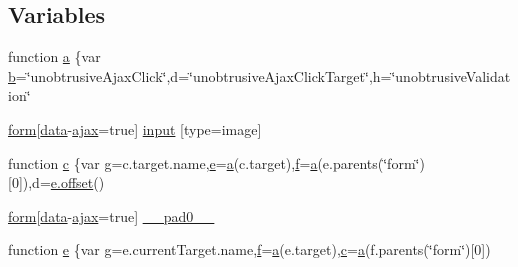 \subsection*{Variables}
\begin{DoxyCompactItemize}
\item 
function \hyperlink{jquery_8unobtrusive-ajax_8min_8js_aa4d4888597588a84fd5b1184d00c91f3}{a} \{var \hyperlink{_scripts_2bootstrap_8min_8js_a7c192e47b11481e4717b9f1e04eb4420}{b}=\char`\"{}unobtrusive\+Ajax\+Click\char`\"{},d=\char`\"{}unobtrusive\+Ajax\+Click\+Target\char`\"{},h=\char`\"{}unobtrusive\+Validation\char`\"{}
\item 
\hyperlink{login_8js_acfb5ebf8920e47b6c6d297e6ca2a6ce0}{form}\mbox{[}\hyperlink{jquery_8unobtrusive-ajax_8min_8js_a8f172ae31c11770303ca0c4cb48ceb3a}{data}-\/\hyperlink{_scripts_2jquery_8validate_8js_a77004c0fdc08a5bc07afa0b099cdf6df}{ajax}=true\mbox{]} \hyperlink{jquery_8unobtrusive-ajax_8min_8js_a22211e450825dd03852dfba097324407}{input} \mbox{[}type=image\mbox{]}
\item 
function \hyperlink{jquery_8unobtrusive-ajax_8min_8js_ad9d1ac02e33c4aed62ad517a7cb8b3fb}{c} \{var \hyperlink{jquery_8unobtrusive-ajax_8min_8js_abdf64181dd0fecc8ac45c3cfa81562b1}{g}=c.\+target.\+name,\hyperlink{jquery_8unobtrusive-ajax_8min_8js_a1bbdb559c9d41205c42f84b233650eb3}{e}=\hyperlink{jquery_8unobtrusive-ajax_8min_8js_a9cf3d65797f4cbe9deaab01492290370}{a}(c.\+target),\hyperlink{_scripts_2jquery_8validate_8unobtrusive_8min_8js_a775508d78fd0500ad5567eb03db78606}{f}=\hyperlink{jquery_8unobtrusive-ajax_8min_8js_a9cf3d65797f4cbe9deaab01492290370}{a}(e.\+parents(\char`\"{}form\char`\"{})\mbox{[}0\mbox{]}),d=\hyperlink{_scripts_2jquery-1_810_82_8js_a4a9f594d20d927164551fc7fa4751a2f}{e.\+offset}()
\item 
\hyperlink{login_8js_acfb5ebf8920e47b6c6d297e6ca2a6ce0}{form}\mbox{[}\hyperlink{jquery_8unobtrusive-ajax_8min_8js_a8f172ae31c11770303ca0c4cb48ceb3a}{data}-\/\hyperlink{_scripts_2jquery_8validate_8js_a77004c0fdc08a5bc07afa0b099cdf6df}{ajax}=true\mbox{]} \hyperlink{jquery_8unobtrusive-ajax_8min_8js_aacc01fb2f7f20fad36cb15fd09efb750}{\+\_\+\+\_\+pad0\+\_\+\+\_\+}
\item 
function \hyperlink{jquery_8unobtrusive-ajax_8min_8js_a2c038346d47955cbe2cb91e338edd7e1}{e} \{var \hyperlink{jquery_8unobtrusive-ajax_8min_8js_abdf64181dd0fecc8ac45c3cfa81562b1}{g}=e.\+current\+Target.\+name,\hyperlink{_scripts_2jquery_8validate_8unobtrusive_8min_8js_a775508d78fd0500ad5567eb03db78606}{f}=\hyperlink{jquery_8unobtrusive-ajax_8min_8js_a9cf3d65797f4cbe9deaab01492290370}{a}(e.\+target),\hyperlink{_scripts_2jquery_8validate_8unobtrusive_8min_8js_a49679efee850e553095f7d06862738a7}{c}=\hyperlink{jquery_8unobtrusive-ajax_8min_8js_a9cf3d65797f4cbe9deaab01492290370}{a}(f.\+parents(\char`\"{}form\char`\"{})\mbox{[}0\mbox{]})

\end{DoxyCompactItemize}
